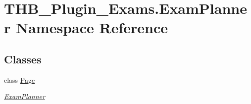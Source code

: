 \hypertarget{namespace_t_h_b___plugin___exams_1_1_exam_planner}{}\section{T\+H\+B\+\_\+\+Plugin\+\_\+\+Exams.\+Exam\+Planner Namespace Reference}
\label{namespace_t_h_b___plugin___exams_1_1_exam_planner}
\subsection*{Classes}
\begin{DoxyCompactItemize}
\item 
class \mbox{\hyperlink{class_t_h_b___plugin___exams_1_1_exam_planner_1_1_page}{Page}}
\begin{DoxyCompactList}\small\item\em \mbox{\hyperlink{class_t_h_b___plugin___exams_1_1_exam_planner}{Exam\+Planner}} \end{DoxyCompactList}\end{DoxyCompactItemize}
